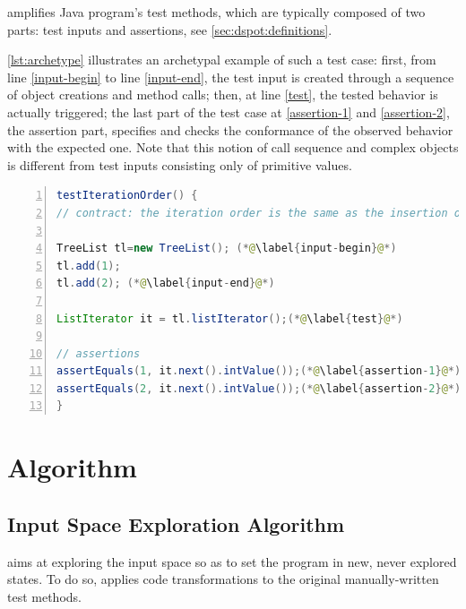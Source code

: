 \dspot amplifies Java program's test methods, which are typically composed of two parts: test inputs and assertions, see \autoref{sec:dspot:definitions}.

\autoref{lst:archetype} illustrates an archetypal example of such a test case: 
first, from line \autoref{input-begin} to line \autoref{input-end}, the test input is created through a sequence of object creations and method calls; 
then, at line \autoref{test}, the tested behavior is actually triggered; 
the last part of the test case at \autoref{assertion-1} and \autoref{assertion-2}, the assertion part, specifies and checks the conformance of the observed behavior with the expected one.
Note that this notion of call sequence and complex objects is different from test inputs consisting only of primitive values.

\begin{lstlisting}[caption={An example of an object-oriented test case  (inspired from Apache Commons Collections)},label=lst:archetype,float,language=java,numbers=left] 
testIterationOrder() {
// contract: the iteration order is the same as the insertion order

TreeList tl=new TreeList(); (*@\label{input-begin}@*)
tl.add(1);
tl.add(2); (*@\label{input-end}@*)

ListIterator it = tl.listIterator();(*@\label{test}@*)

// assertions
assertEquals(1, it.next().intValue());(*@\label{assertion-1}@*)
assertEquals(2, it.next().intValue());(*@\label{assertion-2}@*)
}
\end{lstlisting}

\section{Algorithm}
\label{sec:dspot:algorithm}
\subsection{Input Space Exploration Algorithm}
\label{subsec:dspot:algorithm:input-space-exploration}

\dspot aims at exploring the input space so as to set the program in new, never explored states. To do so, \dspot applies code transformations to the original manually-written test methods. 

